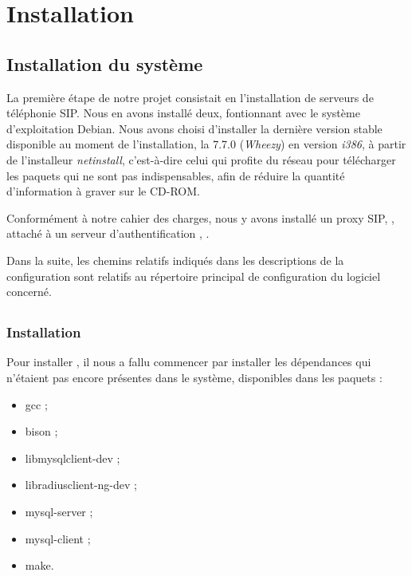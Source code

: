 \section{Installation}

\subsection{Installation du système}

La première étape de notre projet consistait en l’installation de serveurs de téléphonie SIP. Nous en avons installé deux, fontionnant avec le système d’exploitation Debian. Nous avons choisi d’installer la dernière version stable disponible au moment de l’installation, la 7.7.0 (\textit{Wheezy}) en version \textit{i386}, à partir de l’installeur \textit{netinstall}, c’est-à-dire celui qui profite du réseau pour télécharger les paquets qui ne sont pas indispensables, afin de réduire la quantité d’information à graver sur le CD-ROM.

Conformément à notre cahier des charges, nous y avons installé un proxy SIP, {\kam}, attaché à un serveur d’authentification {\rad}, {\frad}.

Dans la suite, les chemins relatifs indiqués dans les descriptions de la configuration sont relatifs au répertoire principal de configuration du logiciel concerné.

\subsection{\kam}

\subsubsection{Installation}

Pour installer {\kam}, il nous a fallu commencer par installer les dépendances qui n’étaient pas encore présentes dans le système, disponibles dans les paquets :

\begin{itemize}
	\item{gcc} ;
	\item{bison} ;
	\item{libmysqlclient-dev} ;
	\item{libradiusclient-ng-dev} ;
	\item{mysql-server} ;
	\item{mysql-client} ;
	\item{make}.
\end{itemize}

